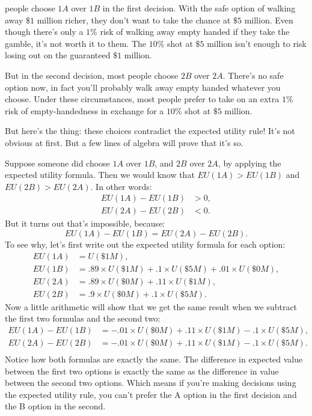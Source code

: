 \documentclass[justified]{tufte-book}
\renewcommand{\u}{U}
\newcommand{\EU}{EU}
\theoremstyle{definition}
\theoremstyle{definition}
\theoremstyle{definition}
\theoremstyle{remark}
\begin{document}
 people choose \(1A\) over \(1B\) in the first decision. With the safe option of walking away \(\$1\) million richer, they don't want to take the chance at \(\$5\) million. Even though there's only a \(1\%\) risk of walking away empty handed if they take the gamble, it's not worth it to them. The \(10\%\) shot at \(\$5\) million isn't enough to risk losing out on the guaranteed \(\$1\) million.

But in the second decision, most people choose \(2B\) over \(2A\). There's no safe option now, in fact you'll probably walk away empty handed whatever you choose. Under these circumstances, most people prefer to take on an extra \(1\%\) risk of empty-handedness in exchange for a \(10\%\) shot at \(\$5\) million.

But here's the thing: these choices contradict the expected utility rule! It's not obvious at first. But a few lines of algebra will prove that it's so.

Suppose someone did choose \(1A\) over \(1B\), and \(2B\) over \(2A\), by applying the expected utility formula. Then we would know that \(\EU(1A) > \EU(1B)\) and \(\EU(2B) > \EU(2A)\). In other words:
\[
  \begin{aligned}
    \EU(1A) - \EU(1B) &> 0,\\
    \EU(2A) - \EU(2B) &< 0.
  \end{aligned}
\]
But it turns out that's impossible, because:
\[ \EU(1A) - \EU(1B) = \EU(2A) - \EU(2B). \]
To see why, let's first write out the expected utility formula for each option:
\[
  \begin{aligned}
     \EU(1A) &= \u(\$1M),\\
     \EU(1B) &= .89 \times \u(\$1M) + .1 \times \u(\$5M) + .01 \times \u(\$0M),\\
     \EU(2A) &= .89 \times \u(\$0M) + .11 \times \u(\$1M),\\
     \EU(2B) &= .9 \times \u(\$0M) + .1 \times\u(\$5M).
  \end{aligned}
\]
Now a little arithmetic will show that we get the same result when we subtract the first two formulas and the second two:
\[
  \begin{aligned}
    \EU(1A) - \EU(1B) &= -.01 \times \u(\$0M) + .11 \times \u(\$1M) - .1 \times \u(\$5M),\\
    \EU(2A) - \EU(2B) &= -.01 \times \u(\$0M) + .11 \times \u(\$1M) - .1 \times \u(\$5M).\\
  \end{aligned}
\]
Notice how both formulas are exactly the same. The difference in expected value between the first two options is exactly the same as the difference in value between the second two options. Which means if you're making decisions using the expected utility rule, you can't prefer the A option in the first decision and the B option in the second.
\end{document}
